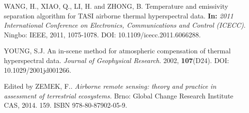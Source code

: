 \begin{thebibliography}{10}
 WANG, H., XIAO, Q., LI, H. and ZHONG, B. Temperature and emissivity separation algorithm for TASI airborne thermal hyperspectral data. \textbf{In:} \textit{2011 International Conference on Electronics, Communications and Control (ICECC)}. Ningbo: IEEE, 2011, 1075-1078. DOI: 10.1109/icecc.2011.6066288.

 YOUNG, S.J. An in-scene method for atmospheric compensation of thermal hyperspectral data. \textit{Journal of Geophysical Research}. 2002, \textbf{107}(D24). DOI: 10.1029/2001jd001266.

 Edited by ZEMEK, F.. \textit{Airborne remote sensing: theory and practice in assessment of terrestrial ecosystems.} Brno: Global Change Research Institute CAS, 2014. 159. ISBN 978-80-87902-05-9.








\end{thebibliography}